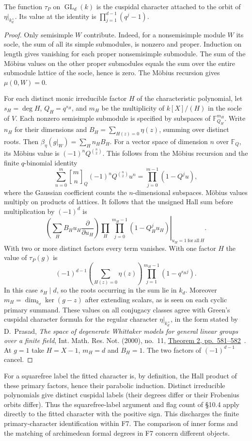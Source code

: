 \begin{lemma}\label{lem:fitted-primary-character}
The function $\tau_P$ on $\operatorname{GL}_d(k)$ is the cuspidal
character attached to the orbit of $\eta|_{k_d^\times}$. Its value
at the identity is $\prod_{j=1}^{d-1}(q^j-1)$.
\end{lemma}
\begin{proof}
Only semisimple $W$ contribute. Indeed, for a nonsemisimple module $W$
its socle, the sum of all its simple submodules, is nonzero and proper.
Induction on length gives vanishing for each proper nonsemisimple
submodule. The sum of the M\"obius values on the other proper submodules
equals the sum over the entire submodule lattice of the socle, hence is
zero. The M\"obius recursion gives $\mu(0,W)=0$.

For each distinct monic irreducible factor $H$ of the characteristic
polynomial, let $s_H=\deg H$, $Q_H=q^{s_H}$, and $m_H$ be the multiplicity
of $k[X]/(H)$ in the socle of $V$. Each nonzero semisimple submodule is
specified by subspaces of $\mathbb F_{Q_H}^{m_H}$. Write $n_H$ for their
dimensions and $B_H=\sum_{H(z)=0}\eta(z)$, summing over distinct roots.
Then $\beta_\eta(g|_W)=\sum_H n_H B_H$. For a vector space of
dimension $n$ over $\mathbb F_Q$, its M\"obius value is
$(-1)^n Q^{\binom n2}$. This follows from the M\"obius recursion and
the finite $q$-binomial identity
\[
 \sum_{n=0}^{m}{m\brack n}_Q(-1)^n Q^{\binom n2}u^n
       =\prod_{j=0}^{m-1}(1-Q^j u),
\]
where the Gaussian coefficient counts the $n$-dimensional subspaces.
M\"obius values multiply on products of lattices. It follows that the
unsigned Hall sum before multiplication by $(-1)^d$ is
\[
 \left.
 \left(\sum_H B_H u_H\frac{\partial}{\partial u_H}\right)
 \prod_H\prod_{j=0}^{m_H-1}(1-Q_H^j u_H)
 \right|_{u_H=1\ \mathrm{for\ all}\ H}.
\]
With two or more distinct factors every term vanishes. With one factor $H$
the value of $\tau_P(g)$ is
\[
       (-1)^{d-1}
       \left(\sum_{H(z)=0}\eta(z)\right)
              \prod_{j=1}^{m_H-1}(1-q^{s_H j}).
\]
In this case $s_H\mid d$, so the roots occurring in the sum lie in $k_d$.
Moreover $m_H=\dim_{k_d}\ker(g-z)$ after extending scalars, as is seen
on each cyclic primary summand. These values on all conjugacy classes agree
with Green's cuspidal character formula for the regular character
$\eta|_{k_d^\times}$, in the form stated by D.~Prasad,
\emph{The space of degenerate Whittaker models for general linear groups
over a finite field}, Int. Math. Res. Not. (2000), no.~11,
\href{https://repository.ias.ac.in/36158/1/36158.pdf}{Theorem 2, pp.~581--582}~\cite{prasad}.
At $g=1$ take $H=X-1$, $m_H=d$ and $B_H=1$. The two factors of
$(-1)^{d-1}$ cancel.
\end{proof}

For a squarefree label the fitted character is, by definition, the Hall
product of these primary factors, hence their parabolic induction.
Distinct irreducible polynomials give distinct cuspidal labels (their
degrees differ or their Frobenius orbits differ). Thus the squarefree-label
argument and flag count of \S10.4 apply directly to the fitted character
with the positive sign. This discharges the finite primary-character
identification within F7. The comparison of inner forms and the matching
of archimedean formal degrees in F7 concern different objects.
